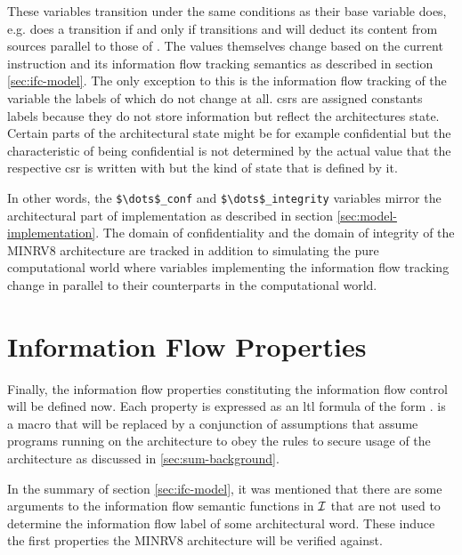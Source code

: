 These variables transition under the same conditions as their base variable does, e.g.  does a transition if and only if  transitions and  will deduct its content from sources parallel to those of .
The values themselves change based on the current instruction and its information flow tracking semantics as described in section \ref{sec:ifc-model}.
The only exception to this is the information flow tracking of the variable  the labels of which do not change at all.
\Glspl{csr} are assigned constants labels because they do not store information but reflect the architectures state.
Certain parts of the architectural state might be for example confidential but the characteristic of being confidential is not determined by the actual value that the respective \gls{csr} is written with but the kind of state that is defined by it.

In other words, the \lstinline[language=SMV,mathescape]{$\dots$_conf} and \lstinline[language=SMV,mathescape]{$\dots$_integrity} variables mirror the architectural part of implementation as described in section \ref{sec:model-implementation}.
The domain of confidentiality and the domain of integrity of the MINRV8 architecture are tracked in addition to simulating the pure computational world where variables implementing the information flow tracking change in parallel to their counterparts in the computational world.

\section{Information Flow Properties}
\label{sec:ifc-properties}

Finally, the information flow properties constituting the information flow control will be defined now.
Each property is expressed as an \gls{ltl} formula of the form .
 is a macro that will be replaced by a conjunction of assumptions that assume programs running on the architecture to obey the rules to secure usage of the architecture as discussed in \ref{sec:sum-background}.

In the summary of section \ref{sec:ifc-model}, it was mentioned that there are some arguments to the information flow semantic functions in $ \mathcal{I} $ that are not used to determine the information flow label of some architectural word.
These induce the first properties the MINRV8 architecture will be verified against.

